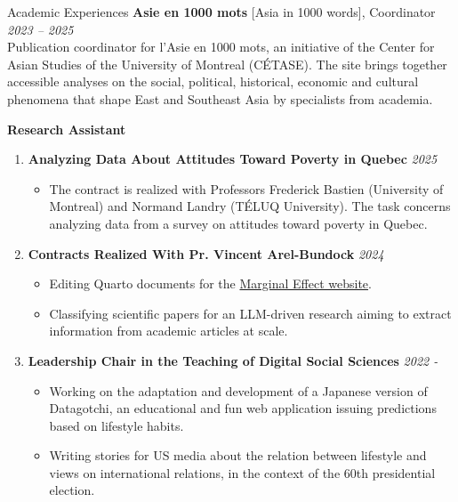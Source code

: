 \documentclass{resume} %
\begin{document}
\begin{rSection}{Academic Experiences}
	{\bf Asie en 1000 mots}{ [Asia in 1000 words], Coordinator} \hfill {\em 2023 -- 2025}\\
	Publication coordinator for l'Asie en 1000 mots, an initiative of the Center for Asian Studies of the University of Montreal (CÉTASE). The site brings together accessible analyses on the social, political, historical, economic and cultural phenomena that shape East and Southeast Asia by specialists from academia.

		{\bf Research Assistant}
	\begin{enumerate}
		\item \textbf{Analyzing Data About Attitudes Toward Poverty in Quebec} \hfill {\em 2025}
		      \begin{itemize}
			      \item The contract is realized with Professors Frederick Bastien (University of Montreal) and Normand Landry (TÉLUQ University). The task concerns analyzing data from a survey on attitudes toward poverty in Quebec.
		      \end{itemize}
		\item \textbf{Contracts Realized With Pr. Vincent Arel-Bundock} \hfill {\em 2024}
		      \begin{itemize}
			      \item Editing Quarto documents for the \href{https://marginaleffects.com}{Marginal Effect website}.
			      \item Classifying scientific papers for an LLM-driven research aiming to extract information from academic articles at scale.
		      \end{itemize}
		\item \textbf{Leadership Chair in the Teaching of Digital Social Sciences} \hfill {\em 2022 -}
		      \begin{itemize}
			      \item {Working on the adaptation and development of a Japanese version of Datagotchi, an educational and fun web application issuing predictions based on lifestyle habits.}
			      \item Writing stories for US media about the relation between lifestyle and views on international relations, in the context of the 60th presidential election.

\end{itemize}
\end{enumerate}
\end{rSection}
\end{document}
